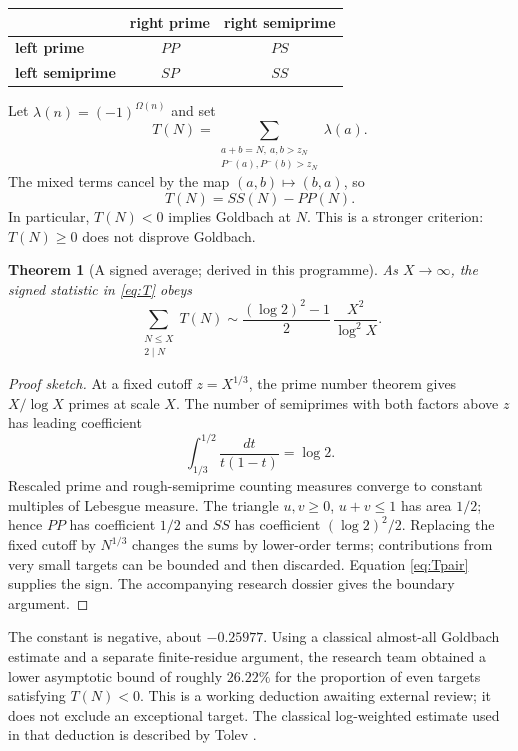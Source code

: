 \documentclass[11pt,a4paper]{article}
\newtheorem{theorem}[prop]{Theorem}
\newcommand{\Om}{\Omega}
\newcommand{\rough}{P^{-}}
\newcommand{\liou}{\lambda}
\begin{document}
\begin{center}
\renewcommand{\arraystretch}{1.45}
\begin{tabular}{@{}lcc@{}}\toprule
& \textbf{right prime} & \textbf{right semiprime}\\\midrule
\textbf{left prime} & $PP$ & $PS$\\
\textbf{left semiprime} & $SP$ & $SS$\\\bottomrule
\end{tabular}
\end{center}

Let $\liou(n)=(-1)^{\Om(n)}$ and set
\begin{equation}\label{eq:T}
 T(N)=\sum_{\substack{a+b=N,\ a,b>z_N\\ \rough(a),\rough(b)>z_N}}\liou(a).
\end{equation}
The mixed terms cancel by the map $(a,b)\mapsto(b,a)$, so
\begin{equation}\label{eq:Tpair}
 T(N)=SS(N)-PP(N).
\end{equation}
In particular, $T(N)<0$ implies Goldbach at $N$. This is a stronger criterion: $T(N)\ge0$ does not disprove Goldbach.

\begin{theorem}[A signed average; derived in this programme]\label{thm:mean}
As $X\to\infty$, the signed statistic in \eqref{eq:T} obeys
\[
 \sum_{\substack{N\le X\\2\mid N}} T(N)
 \sim \frac{(\log2)^2-1}{2}\,\frac{X^2}{\log^2X}.
\]
\end{theorem}
\begin{proof}[Proof sketch]
At a fixed cutoff $z=X^{1/3}$, the prime number theorem gives $X/\log X$ primes at scale $X$. The number of semiprimes with both factors above $z$ has leading coefficient
\[
 \int_{1/3}^{1/2}\frac{dt}{t(1-t)}=\log2.
\]
Rescaled prime and rough-semiprime counting measures converge to constant multiples of Lebesgue measure. The triangle $u,v\ge0$, $u+v\le1$ has area $1/2$; hence $PP$ has coefficient $1/2$ and $SS$ has coefficient $(\log2)^2/2$. Replacing the fixed cutoff by $N^{1/3}$ changes the sums by lower-order terms; contributions from very small targets can be bounded and then discarded. Equation \eqref{eq:Tpair} supplies the sign. The accompanying research dossier gives the boundary argument.\end{proof}

The constant is negative, about $-0.25977$. Using a classical almost-all Goldbach estimate and a separate finite-residue argument, the research team obtained a lower asymptotic bound of roughly $26.22\%$ for the proportion of even targets satisfying $T(N)<0$. This is a working deduction awaiting external review; it does not exclude an exceptional target. The classical log-weighted estimate used in that deduction is described by Tolev \cite{tolev}.
\end{document}

